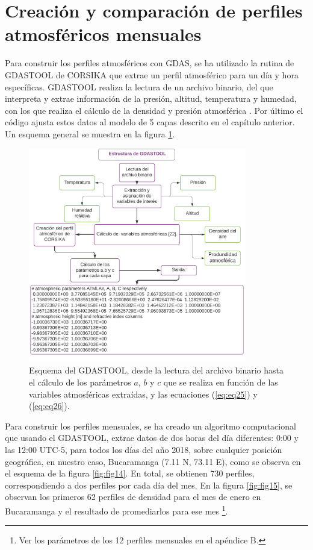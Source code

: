 \section{Creaci\'on y comparaci\'on de perfiles atmosf\'ericos mensuales}
Para construir los perfiles atmosféricos con GDAS, se ha utilizado la rutina de GDASTOOL de CORSIKA \citep{Heck1998} que extrae un perfil atmosférico para un día y hora específicas. GDASTOOL realiza la lectura de un archivo binario, del que interpreta y extrae información de la presión, altitud, temperatura y humedad, con los que realiza el cálculo de la densidad y presión atmosférica  \citep{GDAS_Auger}. Por último el código ajusta estos datos al modelo de 5 capas descrito en el capítulo anterior. Un esquema general se muestra en la figura \ref{fig:fig13}.
\begin{figure}[htb!]
\centering
\includegraphics[width=0.85\textwidth]{Figs/GDASTOOL_code.pdf}
\caption[Esquema de GDASTOOL]{Esquema del GDASTOOL, desde la lectura del archivo binario hasta el cálculo de los parámetros $a$, $b$ y $c$ que se realiza en función de las variables atmosféricas extraídas, y las ecuaciones (\ref{eq:eq25}) y (\ref{eq:eq26}).}
 \label{fig:fig13}
 \end{figure}
\newpage
Para construir los perfiles mensuales, se ha creado un algoritmo computacional que usando el GDASTOOL, extrae datos de dos horas del día diferentes: 0:00 y las 12:00 UTC-5, para todos los días del año 2018, sobre cualquier posición geográfica, en nuestro caso, Bucaramanga (7.11 N, 73.11 E), como se observa en el esquema de la figura \ref{fig:fig14}. En total, se obtienen 730 perfiles, correspondiendo a dos perfiles por cada día del mes. En la figura \ref{fig:fig15}, se observan los primeros 62 perfiles de densidad para el mes de enero en Bucaramanga y el resultado de promediarlos para ese mes \footnote{Ver los parámetros de los 12 perfiles mensuales en el apéndice B.}.\\

